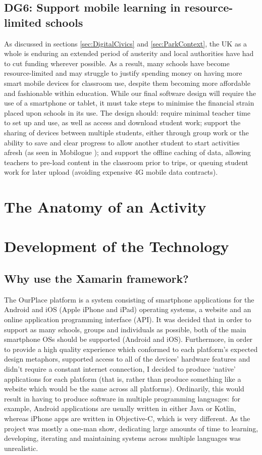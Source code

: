 \subsection*{ DG6: Support mobile learning in resource-limited schools }
\label{DG6}

As discussed in sections \ref{sec:DigitalCivics} and \ref{sec:ParkContext}, the UK as a whole is enduring an extended period of austerity and local authorities have had to cut funding wherever possible. As a result, many schools have become resource-limited and may struggle to justify spending money on having more smart mobile devices for classroom use, despite them becoming more affordable and fashionable within education. While our final software design will require the use of a smartphone or tablet, it must take steps to minimise the financial strain placed upon schools in its use. The design should: require minimal teacher time to set up and use, as well as access and download student work; support the sharing of devices between multiple students, either through group work or the ability to save and clear progress to allow another student to start activities afresh (as seen in Mobilogue \citep{Giemza2013}); and support the offline caching of data, allowing teachers to pre-load content in the classroom prior to trips, or queuing student work for later upload (avoiding expensive 4G mobile data contracts).

\section{The Anatomy of an Activity}
\label{sec:ActivityOverview}

\section{Development of the Technology}

\subsection{Why use the Xamarin framework?}
The OurPlace platform is a system consisting of smartphone applications for the
Android and iOS (Apple iPhone and iPad) operating systems, a website and an
online application programming interface (API). It was decided that in order to
support as many schools, groups and individuals as possible, both of the main
smartphone OSs should be supported (Android and iOS). Furthermore, in order to
provide a high quality experience which conformed to each platform's expected
design metaphors,  supported access to all of the devices' hardware features and
didn't require a constant internet connection, I decided to produce `native'
applications for each platform (that is, rather than produce something like a
website which would be the same across all platforms). Ordinarily, this would
result in having to produce software in multiple programming languages: for
example, Android applications are usually written in either Java or Kotlin,
whereas iPhone apps are written in Objective-C, which is very different. As the
project was mostly a one-man show, dedicating large amounts of time to learning,
developing, iterating and maintaining systems across multiple languages was
unrealistic. 

